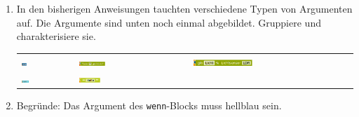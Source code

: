 \documentclass[ngerman, 11pt]{scrreprt}
\begin{document}
	\setcounter{chapter}{3}

	\begin{aufgabe*}
		\begin{enumerate}[label=\alph*), itemsep=0ex, parsep=0ex]
			\item In den bisherigen Anweisungen tauchten verschiedene Typen von Argumenten auf. Die Argumente sind unten noch einmal abgebildet. Gruppiere und charakterisiere sie.
			
			\bigskip
			\begin{tabu} to \textwidth {X[L]X[L,2]X[L,3]}
				\includegraphics[width=0.1\textwidth]{../pics/zahlargument1.png} & 
				\includegraphics[width=0.25\textwidth]{../pics/wahrheitswertargument1.png} & 
				\includegraphics[width=0.38\textwidth]{../pics/zahlargument2.png} \\
				\includegraphics[width=0.15\textwidth]{../pics/wahrheitswertargument2.png} & 
				\includegraphics[width=0.2\textwidth]{../pics/textargument.png} & \\
			\end{tabu}
			\bigskip
			\item Begründe: Das Argument des \texttt{wenn}-Blocks muss hellblau sein. 
		\end{enumerate}
	\end{aufgabe*}
\end{document}
